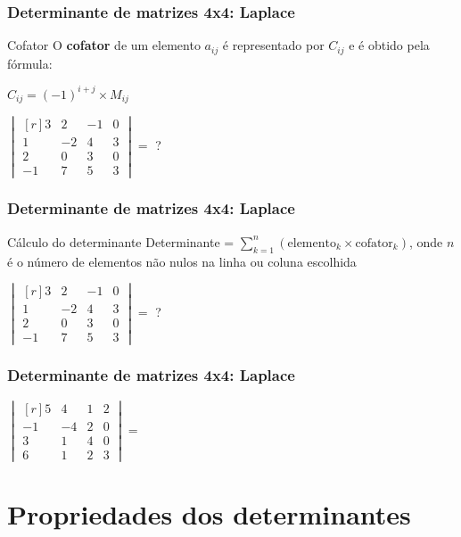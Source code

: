 \documentclass[pdftex, brazil, aspectratio=169]{beamer}
\begin{document}
\begin{frame}[t]
  \frametitle{Determinante de matrizes 4x4: Laplace}
  \begin{block}{Cofator}
    O \textbf{cofator} de um elemento $a_{ij}$ é representado por
    $C_{ij}$ e é obtido pela fórmula:
  \begin{center}
    $C_{ij} = (-1)^{i+j} \times M_{ij}$
  \end{center}
  \end{block}
  $\begin{vmatrix*}[r]
    3 & 2 & -1 & 0\\
    1 & -2 & 4 & 3\\
    2 & 0 & 3 & 0\\
    -1 & 7 & 5 & 3\end{vmatrix*} =$ ?
\end{frame}

\begin{frame}[t]
  \frametitle{Determinante de matrizes 4x4: Laplace}
  \begin{block}{Cálculo do determinante}
    Determinante = $\displaystyle \sum_{k=1}^n (\text{elemento}_k \times \text{cofator}_k)$,
        onde $n$ é o número de elementos não nulos na linha ou coluna escolhida
  \end{block}
  $\begin{vmatrix*}[r]
    3 & 2 & -1 & 0\\
    1 & -2 & 4 & 3\\
    2 & 0 & 3 & 0\\
    -1 & 7 & 5 & 3\end{vmatrix*} =$ ?
\end{frame}

\begin{frame}[t]
  \frametitle{Determinante de matrizes 4x4: Laplace}
  $\begin{vmatrix*}[r]
    5 & 4 & 1 & 2\\
    -1 & -4 & 2 & 0\\
    3 & 1 & 4 & 0\\
    6 & 1 & 2 & 3\end{vmatrix*} =$
\end{frame}


\section{Propriedades dos determinantes}
\end{document}
